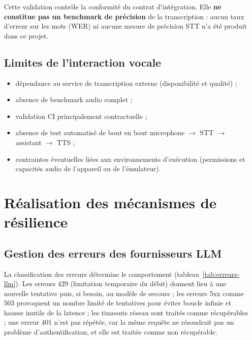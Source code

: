 \documentclass[11pt,a4paper,openany,oneside]{report}
\begin{document}
Cette validation contrôle la conformité du contrat d'intégration. Elle \textbf{ne constitue pas un benchmark de précision} de la transcription : aucun taux d'erreur sur les mots (WER) ni aucune mesure de précision STT n'a été produit dans ce projet.

\subsection{Limites de l'interaction vocale}
\begin{itemize}
\item dépendance au service de transcription externe (disponibilité et qualité) ;
\item absence de benchmark audio complet ;
\item validation CI principalement contractuelle ;
\item absence de test automatisé de bout en bout microphone $\rightarrow$ STT $\rightarrow$ assistant $\rightarrow$ TTS ;
\item contraintes éventuelles liées aux environnements d'exécution (permissions et capacités audio de l'appareil ou de l'émulateur).
\end{itemize}

\section{Réalisation des mécanismes de résilience}
\subsection{Gestion des erreurs des fournisseurs LLM}
La classification des erreurs détermine le comportement (tableau~\ref{tab:erreurs-llm}). Les erreurs 429 (limitation temporaire du débit) donnent lieu à une nouvelle tentative puis, si besoin, au modèle de secours ; les erreurs 5xx comme 503 provoquent un nombre limité de tentatives pour éviter boucle infinie et hausse inutile de la latence ; les timeouts réseau sont traités comme récupérables ; une erreur 401 n'est pas répétée, car la même requête ne résoudrait pas un problème d'authentification, et elle est traitée comme non récupérable.
\end{document}
